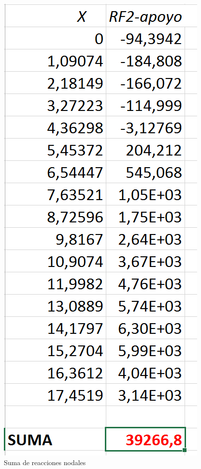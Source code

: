\documentclass[spanish,a4paper,12pt]{article}
\begin{document}
\begin{figure}[!htbp]
\centering
\includegraphics[scale=0.45]{capturas2019/a_fig44p1.png}
\caption{Suma de reacciones nodales}
\label{fig:suma-reac-nod}
\end{figure}
\end{document}
